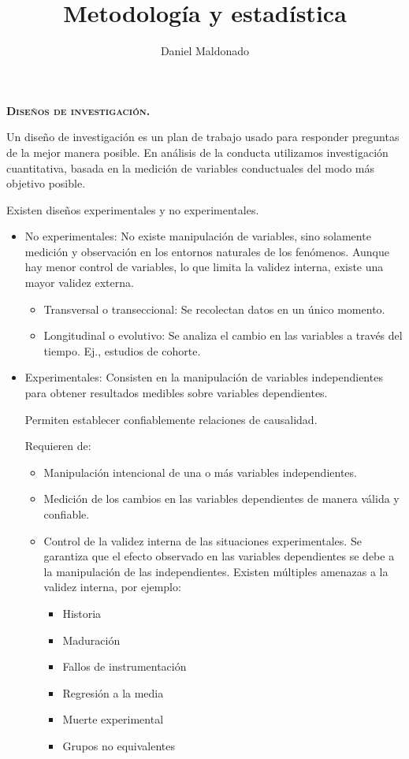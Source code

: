 \documentclass[a4paper,12pt]{article}
\title{Metodología y estadística}
\author{Daniel Maldonado}
\date{}
\begin{document}
{\scshape\bfseries \maketitle}

{\noindent\scshape\bfseries Diseños de investigación.}

Un diseño de investigación es un plan de trabajo usado para responder preguntas de la mejor manera posible. En análisis de la conducta utilizamos investigación cuantitativa, basada en la medición de variables conductuales del modo más objetivo posible.

Existen diseños experimentales y no experimentales.

\begin{itemize}
    \item No experimentales: No existe manipulación de variables, sino solamente medición y observación en los entornos naturales de los fenómenos. Aunque hay menor control de variables, lo que limita la validez interna, existe una mayor validez externa.
        \begin{itemize}
            \item Transversal o transeccional: Se recolectan datos en un único momento.
            \item Longitudinal o evolutivo: Se analiza el cambio en las variables a través del tiempo. Ej., estudios de cohorte.
        \end{itemize}
    \item Experimentales: Consisten en la manipulación de variables independientes para obtener resultados medibles sobre variables dependientes.

        Permiten establecer confiablemente relaciones de causalidad.

        Requieren de:
        \begin{itemize}
            \item Manipulación intencional de una o más variables independientes.
            \item Medición de los cambios en las variables dependientes de manera válida y confiable.
            \item Control de la validez interna de las situaciones experimentales. Se garantiza que el efecto observado en las variables dependientes se debe a la manipulación de las independientes. Existen múltiples amenazas a la validez interna, por ejemplo:
                \begin{itemize}
                    \item Historia
                    \item Maduración
                    \item Fallos de instrumentación
                    \item Regresión a la media
                    \item Muerte experimental
                    \item Grupos no equivalentes
                \end{itemize}
        \end{itemize}


\end{itemize}
\end{document}

